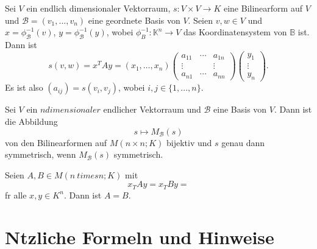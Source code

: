 \documentclass[11pt, a4paper]{article}
\begin{document}
\begin{remark} Sei $V$ ein endlich dimensionaler Vektorraum, $s : V \times V \rightarrow K$ eine Bilinearform auf $V$ und $\mathcal{B} = (v_1, ..., v_n)$ eine geordnete Basis von $V$. Seien $v, w \in V$ und $x = \phi^{-1}_\mathcal{B}(v)$, $y = \phi^{-1}_\mathcal{B}(y)$, wobei $\phi^{-1}_B : \mathbb{K}^n \rightarrow V$ das Koordinatensystem von $\mathbb{B}$ ist. Dann ist
\begin{equation*}
s(v, w)= x^T A y=\left(x_{1}, \ldots, x_{n}\right)\left(\begin{array}{ccc}a_{11} & \cdots & a_{1 n} \\ \vdots & & \vdots \\ a_{n 1} & \cdots & a_{n n}\end{array}\right)\left(\begin{array}{c}y_{1} \\ \vdots \\ y_{n}\end{array}\right).
\end{equation*}
Es ist also $(a_{ij}) = s(v_i, v_j)$, wobei $i, j \in \{1, ..., n\}$.
\end{remark}

\begin{theorem}
Sei $V$ ein $ndimensionaler$ endlicher Vektorraum und $\mathcal{B}$ eine Basis von $V$. Dann ist  die Abbildung
\begin{equation*}
s \mapsto M_{\mathcal{B}}(s)
\end{equation*}
von den Bilinearformen auf $M(n \times n; K)$ bijektiv und $s$ genau dann symmetrisch, wenn $M_{\mathcal{B}}(s)$ symmetrisch. 
\end{theorem}

\begin{lemma}
Seien $A, B \in M(n \ times n; K)$ mit 
\begin{equation*}
x_TAy = x_TBy = 
\end{equation*}
f\uee r alle $x, y \in K^n$. Dann ist $A = B$. 
\end{lemma}


\section{N\uee tzliche Formeln und Hinweise}
\end{document}
